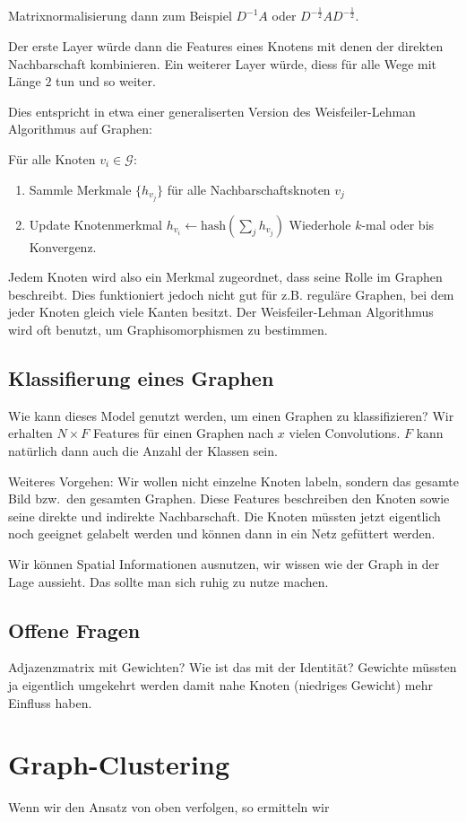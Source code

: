 \documentclass{scrartcl}
\begin{document}
Matrixnormalisierung dann zum Beispiel $D^{-1}A$ oder $D^{-\frac{1}{2}}AD^{-\frac{1}{2}}$.

Der erste Layer würde dann die Features eines Knotens mit denen der direkten Nachbarschaft kombinieren.
Ein weiterer Layer würde, diess für alle Wege mit Länge $2$ tun und so weiter.

Dies entspricht in etwa einer generaliserten Version des Weisfeiler-Lehman Algorithmus auf Graphen:

Für alle Knoten $v_i \in \mathcal{G}$:
\begin{enumerate}
  \item Sammle Merkmale $\lbrace h_{v_j} \rbrace$ für alle Nachbarschaftsknoten ${ v_j }$
  \item Update Knotenmerkmal $h_{v_i} \leftarrow \text{hash}(\sum_j h_{v_j})$
Wiederhole $k$-mal oder bis Konvergenz.
\end{enumerate}

Jedem Knoten wird also ein Merkmal zugeordnet, dass seine Rolle im Graphen beschreibt.
Dies funktioniert jedoch nicht gut für z.B. reguläre Graphen, bei dem jeder Knoten gleich viele Kanten besitzt.
Der Weisfeiler-Lehman Algorithmus wird oft benutzt, um Graphisomorphismen zu bestimmen.

\subsection{Klassifierung eines Graphen}

Wie kann dieses Model genutzt werden, um einen Graphen zu klassifizieren?
Wir erhalten $N \times F$ Features für einen Graphen nach $x$ vielen Convolutions.
$F$ kann natürlich dann auch die Anzahl der Klassen sein.

Weiteres Vorgehen:
Wir wollen nicht einzelne Knoten labeln, sondern das gesamte Bild bzw.\ den gesamten Graphen.
Diese Features beschreiben den Knoten sowie seine direkte und indirekte Nachbarschaft.
Die Knoten müssten jetzt eigentlich noch geeignet gelabelt werden und können dann in ein Netz gefüttert werden.

Wir können Spatial Informationen ausnutzen, wir wissen wie der Graph in der Lage aussieht.
Das sollte man sich ruhig zu nutze machen.

\subsection{Offene Fragen}

Adjazenzmatrix mit Gewichten? Wie ist das mit der Identität? Gewichte müssten ja eigentlich umgekehrt werden damit nahe Knoten (niedriges Gewicht) mehr Einfluss haben.

\section{Graph-Clustering}

  


Wenn wir den Ansatz von oben verfolgen, so ermitteln wir 
\end{document}
